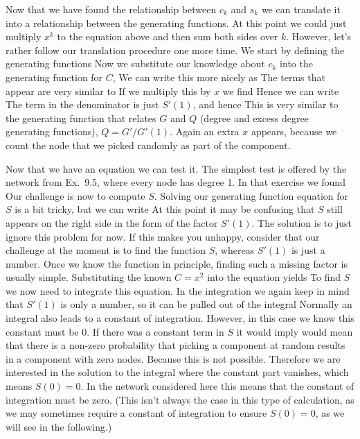 Now that we have found the relationship between $c_k$ and $s_k$ we can translate it into a relationship between the generating functions. At this point we could just multiply $x^k$ to the equation above and then sum both sides over $k$. However, let's rather follow our translation procedure one more time. We start by defining the generating functions
Now we substitute our knowledge about $c_k$ into the generating function for $C$,
We can write this more nicely as 
The terms that appear are very similar to 
If we multiply this by $x$ we find
Hence we can write 
The term in the denominator is just $S'(1)$, and hence
This is very similar to the generating function that relates $G$ and $Q$ (degree and excess degree generating functions), $Q=G'/G'(1)$. Again an extra $x$ appears, because we count the node that we picked randomly 
as part of the component. 

Now that we have an equation we can test it. The simplest test is offered by the network from Ex.~9.5, where every node has degree 1. In that exercise we found 
Our challenge is now to compute $S$. Solving our generating function equation for $S$ is a bit tricky, but we can write
At this point it may be confusing that $S$ still appears on the right side in the form of the factor $S'(1)$. The solution is to just ignore this problem for now. If this makes you unhappy, consider that our challenge at the moment is to find the function $S$, whereas $S'(1)$ is just a number. Once we know the function in principle, finding such a missing factor is usually simple. Substituting the known $C=x^2$ into the equation yields
To find $S$ we now need to integrate this equation. In the integration we again keep in mind that $S'(1)$ is only a number, so it can be pulled out of the integral
Normally an integral also leads to a constant of integration. However, in this case we know this constant must be 0.  If there was a constant term in $S$ it would imply would mean that there is a non-zero probability that picking a component at random results in a component with zero nodes. Because this is not possible. Therefore we are interested in the solution to the integral where the constant part vanishes, which means $S(0)=0$. In the network considered here this means that the constant of integration must be zero. (This isn't always the case in this type of calculation, as we may sometimes require a constant of integration to ensure $S(0)=0$, as we will see in the following.) 

